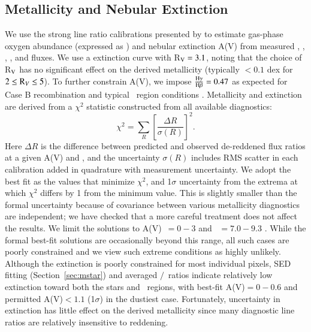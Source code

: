\subsection{Metallicity and Nebular Extinction}\label{sec:z}

We use the strong line ratio calibrations presented by \cite{Maiolino2008} to estimate gas-phase oxygen abundance
(expressed as \oh) and nebular extinction A(V) from measured \OII, \NeIII, \Hg, \Hb, and \OIII fluxes. We use a
\cite{Cardelli1989} extinction curve with R$_{\rm V} = 3.1$, noting that the choice of R$_{\rm V}$ has no
significant effect on the derived metallicity (typically $<0.1$ dex for $2\leq {\rm R_V} \leq 5$).  To further
constrain A(V), we impose $\frac{\rm{H}\gamma}{\rm{H}\beta} = 0.47$ as expected for Case B recombination and
typical \HII\ region conditions \citep[e.g.,][]{Hummer1987}.  Metallicity and extinction are derived from a
$\chi^2$ statistic constructed from all available diagnostics: $$\chi^2 = \sum_R \left[ \frac{\Delta
R}{\sigma(R)} \right]^2.$$
%
Here $\Delta R$ is the difference between predicted and observed de-reddened flux ratios at a given A(V) and \oh,
and the uncertainty $\sigma(R)$ includes RMS scatter in each calibration added in quadrature with measurement
uncertainty. We adopt the best fit as the values that minimize $\chi^2$, and 1$\sigma$ uncertainty from the
extrema at which $\chi^2$ differs by 1 from the minimum value. This is slightly smaller than the formal
uncertainty because of covariance between various metallicity diagnostics are independent; we have checked that a
more careful treatment does not affect the results. We limit the solutions to A(V)~$=0-3$ and \oh~$=7.0-9.3$
\citep[equivalent to $0.02-4.1\times$ the solar abundance of \oh~$=8.69$;][]{Allende2001}. While the formal
best-fit solutions are occasionally beyond this range, all such cases are poorly constrained and we view such
extreme conditions as highly unlikely. Although the extinction is poorly constrained for most individual pixels,
SED fitting (Section~\ref{sec:mstar}) and averaged \Hb$/$\Hg\ ratios indicate relatively low extinction toward
both the stars and \HII\ regions, with best-fit A(V)$=0-0.6$ and permitted A(V)$<1.1$ (1$\sigma$) in the dustiest
case. Fortunately, uncertainty in extinction has little effect on the derived metallicity since many diagnostic
line ratios are relatively insensitive to reddening.

